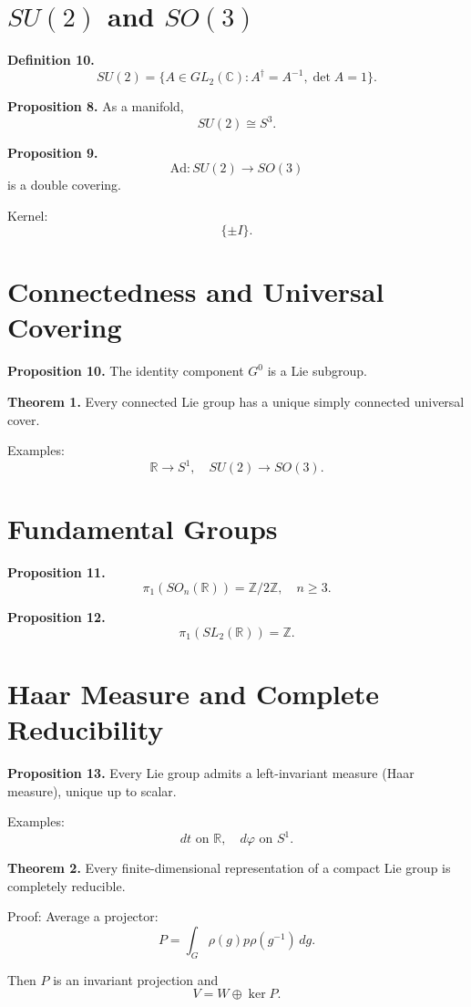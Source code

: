 \section*{$SU(2)$ and $SO(3)$}

\textbf{Definition 10.}
\[
SU(2)=\{A\in GL_2(\mathbb{C}) : A^\dagger=A^{-1}, \det A=1\}.
\]

\textbf{Proposition 8.}
As a manifold,
\[
SU(2)\cong S^3.
\]

\textbf{Proposition 9.}
\[
\mathrm{Ad}:SU(2)\to SO(3)
\]
is a double covering.

Kernel:
\[
\{\pm I\}.
\]

\section*{Connectedness and Universal Covering}

\textbf{Proposition 10.}
The identity component $G^0$ is a Lie subgroup.

\textbf{Theorem 1.}
Every connected Lie group has a unique simply connected universal cover.

Examples:
\[
\mathbb{R}\to S^1,
\quad
SU(2)\to SO(3).
\]

\section*{Fundamental Groups}

\textbf{Proposition 11.}
\[
\pi_1(SO_n(\mathbb{R}))=\mathbb{Z}/2\mathbb{Z}, \quad n\ge3.
\]

\textbf{Proposition 12.}
\[
\pi_1(SL_2(\mathbb{R}))=\mathbb{Z}.
\]

\section*{Haar Measure and Complete Reducibility}

\textbf{Proposition 13.}
Every Lie group admits a left-invariant measure (Haar measure),
unique up to scalar.

Examples:
\[
dt \text{ on } \mathbb{R}, \quad d\varphi \text{ on } S^1.
\]

\textbf{Theorem 2.}
Every finite-dimensional representation of a compact Lie group
is completely reducible.

Proof: Average a projector:
\[
P=\int_G \rho(g)p\rho(g^{-1})\,dg.
\]

Then $P$ is an invariant projection and
\[
V=W\oplus\ker P.
\]